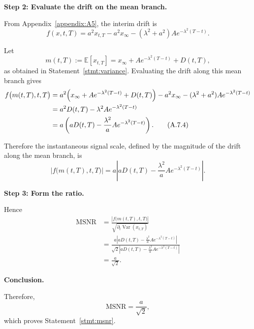 \documentclass[12pt]{article}
\theoremstyle{statementstyle}
\begin{document}
\begin{appendices}
\medskip
\noindent\textbf{Step 2: Evaluate the drift on the mean branch.}

From Appendix~\ref{appendix:A5}, the interim drift is
\begin{equation}
f(x,t,T)
=
a^{2}x_{t,T}
-
a^{2}x_{\infty}
-
(\lambda^{2}+a^{2})A e^{-\lambda^{2}(T-t)}.
\tag{A.7.3}\label{eq:A73}
\end{equation}

Let
\[
m(t,T):=\mathbb{E}[x_{t,T}]
=
x_{\infty}+A e^{-\lambda^{2}(T-t)}+D(t,T),
\]
as obtained in Statement~\ref{stmt:variance}. Evaluating the drift along
this mean branch gives
\begin{align}
f\bigl(m(t,T),t,T\bigr)
&=
a^{2}\Bigl(x_{\infty}+A e^{-\lambda^{2}(T-t)}+D(t,T)\Bigr)
-
a^{2}x_{\infty}
-
(\lambda^{2}+a^{2})A e^{-\lambda^{2}(T-t)}
\nonumber\\
&=
a^{2}D(t,T)-\lambda^{2}A e^{-\lambda^{2}(T-t)}
\nonumber\\
&=
a\left(
aD(t,T)-\frac{\lambda^{2}}{a}A e^{-\lambda^{2}(T-t)}
\right).
\tag{A.7.4}\label{eq:A74}
\end{align}

Therefore the instantaneous signal scale, defined by the magnitude of the
drift along the mean branch, is
\begin{equation}
\left|f\bigl(m(t,T),t,T\bigr)\right|
=
a\left|
aD(t,T)-\frac{\lambda^{2}}{a}A e^{-\lambda^{2}(T-t)}
\right|.
\tag{A.7.5}\label{eq:A75}
\end{equation}

\medskip
\noindent\textbf{Step 3: Form the ratio.}

Hence
\begin{align}
\mathrm{MSNR}
&=
\frac{\left|f\bigl(m(t,T),t,T\bigr)\right|}
{\sqrt{\partial_t\operatorname{Var}(x_{t,T})}}
\nonumber\\
&=
\frac{
a\left|
aD(t,T)-\frac{\lambda^{2}}{a}A e^{-\lambda^{2}(T-t)}
\right|
}{
\sqrt{2}\left|
aD(t,T)-\frac{\lambda^{2}}{a}A e^{-\lambda^{2}(T-t)}
\right|
}
\nonumber\\
&=
\frac{a}{\sqrt{2}}.
\tag{A.7.6}\label{eq:A76}
\end{align}

\medskip
\noindent\textbf{Conclusion.}

Therefore,
\[
\mathrm{MSNR}=\frac{a}{\sqrt{2}},
\]
which proves Statement~\ref{stmt:msnr}.






\end{appendices}
\end{document}
